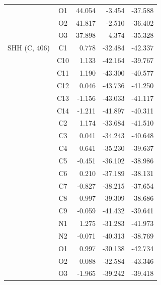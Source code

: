 \begin{longtable}{@{}lcrr@{}}
   & O1 & 44.054 & -3.454 & -37.588 \\
   & O2 & 41.817 & -2.510 & -36.402 \\
   & O3 & 37.898 & 4.374 & -35.328 \\
  \cmidrule(r){1-5}
  SHH (C, 406) & C1 & 0.778 & -32.484 & -42.337 \\
   & C10 & 1.133 & -42.164 & -39.767 \\
   & C11 & 1.190 & -43.300 & -40.577 \\
   & C12 & 0.046 & -43.736 & -41.250 \\
   & C13 & -1.156 & -43.033 & -41.117 \\
   & C14 & -1.211 & -41.897 & -40.311 \\
   & C2 & 1.174 & -33.684 & -41.510 \\
   & C3 & 0.041 & -34.243 & -40.648 \\
   & C4 & 0.641 & -35.230 & -39.637 \\
   & C5 & -0.451 & -36.102 & -38.986 \\
   & C6 & 0.210 & -37.189 & -38.131 \\
   & C7 & -0.827 & -38.215 & -37.654 \\
   & C8 & -0.997 & -39.309 & -38.686 \\
   & C9 & -0.059 & -41.432 & -39.641 \\
   & N1 & 1.275 & -31.283 & -41.973 \\
   & N2 & -0.071 & -40.313 & -38.769 \\
   & O1 & 0.997 & -30.138 & -42.734 \\
   & O2 & 0.088 & -32.584 & -43.346 \\
   & O3 & -1.965 & -39.242 & -39.418 \\
\end{longtable}
